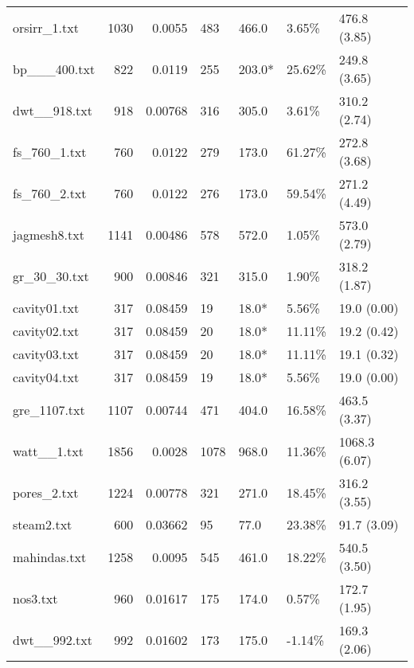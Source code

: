 \begin{table}[h]
\begin{tabular}{lrrllll}
 orsirr_1.txt       &    1030 &     0.0055  & 483          & 466.0           & 3.65\%   & 476.8 (3.85)   \\
 bp___400.txt       &     822 &     0.0119  & 255          & 203.0*          & 25.62\%  & 249.8 (3.65)   \\
 dwt__918.txt       &     918 &     0.00768 & 316          & 305.0           & 3.61\%   & 310.2 (2.74)   \\
 fs_760_1.txt       &     760 &     0.0122  & 279          & 173.0           & 61.27\%  & 272.8 (3.68)   \\
 fs_760_2.txt       &     760 &     0.0122  & 276          & 173.0           & 59.54\%  & 271.2 (4.49)   \\
 jagmesh8.txt       &    1141 &     0.00486 & 578          & 572.0           & 1.05\%   & 573.0 (2.79)   \\
 gr_30_30.txt       &     900 &     0.00846 & 321          & 315.0           & 1.90\%   & 318.2 (1.87)   \\
 cavity01.txt       &     317 &     0.08459 & 19           & 18.0*           & 5.56\%   & 19.0 (0.00)    \\
 cavity02.txt       &     317 &     0.08459 & 20           & 18.0*           & 11.11\%  & 19.2 (0.42)    \\
 cavity03.txt       &     317 &     0.08459 & 20           & 18.0*           & 11.11\%  & 19.1 (0.32)    \\
 cavity04.txt       &     317 &     0.08459 & 19           & 18.0*           & 5.56\%   & 19.0 (0.00)    \\
 gre_1107.txt       &    1107 &     0.00744 & 471          & 404.0           & 16.58\%  & 463.5 (3.37)   \\
 watt__1.txt        &    1856 &     0.0028  & 1078         & 968.0           & 11.36\%  & 1068.3 (6.07)  \\
 pores_2.txt        &    1224 &     0.00778 & 321          & 271.0           & 18.45\%  & 316.2 (3.55)   \\
 steam2.txt         &     600 &     0.03662 & 95           & 77.0            & 23.38\%  & 91.7 (3.09)    \\
 mahindas.txt       &    1258 &     0.0095  & 545          & 461.0           & 18.22\%  & 540.5 (3.50)   \\
 nos3.txt           &     960 &     0.01617 & 175          & 174.0           & 0.57\%   & 172.7 (1.95)   \\
 dwt__992.txt       &     992 &     0.01602 & 173          & 175.0           & -1.14\%  & 169.3 (2.06)   \\

\end{tabular}
\end{table}
